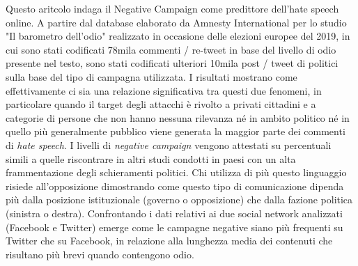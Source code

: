 

Questo aritcolo indaga il Negative Campaign come predittore dell'hate speech online. A partire dal database elaborato da Amnesty International per lo studio "Il barometro dell'odio" realizzato in occasione delle elezioni europee del 2019, in cui sono stati codificati 78mila commenti / re-tweet in base del livello di odio presente nel testo, sono stati codificati ulteriori 10mila post / tweet di politici sulla base del tipo di campagna utilizzata. I risultati mostrano come effettivamente ci sia una relazione significativa tra questi due fenomeni, in particolare quando il target degli attacchi è rivolto a privati cittadini e a categorie di persone che non hanno nessuna rilevanza né in ambito politico né in quello più generalmente pubblico viene generata la maggior parte dei commenti di \textit{hate speech}.
I livelli di \textit{negative campaign} vengono attestati su percentuali simili a quelle riscontrare in altri studi condotti in paesi con un alta frammentazione degli schieramenti politici. Chi utilizza di più questo linguaggio risiede all'opposizione dimostrando come questo tipo di comunicazione dipenda più dalla posizione istituzionale (governo o opposizione) che dalla fazione politica (sinistra o destra).
Confrontando i dati relativi ai due social network analizzati (Facebook e Twitter) emerge come le campagne negative siano più frequenti su Twitter che su Facebook, in relazione alla lunghezza media dei contenuti che risultano più brevi quando contengono odio.